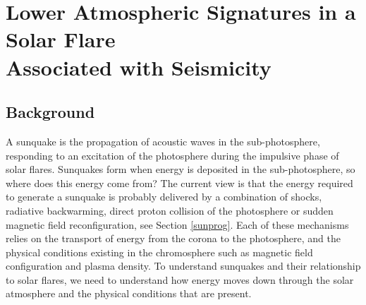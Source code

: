 \section{Lower Atmospheric Signatures in a Solar Flare \\ Associated with Seismicity}




\subsection{Background}
A sunquake is the propagation of acoustic waves in the sub-photosphere, responding to an excitation of the photosphere during the impulsive phase of solar flares. Sunquakes form when energy is deposited in the sub-photosphere, so where does this energy come from? The current view is that the energy required to generate a sunquake is probably delivered by a combination of shocks, radiative backwarming, direct proton collision of the photosphere or sudden magnetic field reconfiguration, see Section \ref{sunprog}. Each of these mechanisms relies on the transport of energy from the corona to the photosphere, and the physical conditions existing in the chromosphere such as magnetic field configuration and plasma density. To understand sunquakes and their relationship to solar flares, we need to understand how energy moves down through the solar atmosphere and the physical conditions that are present. \\

